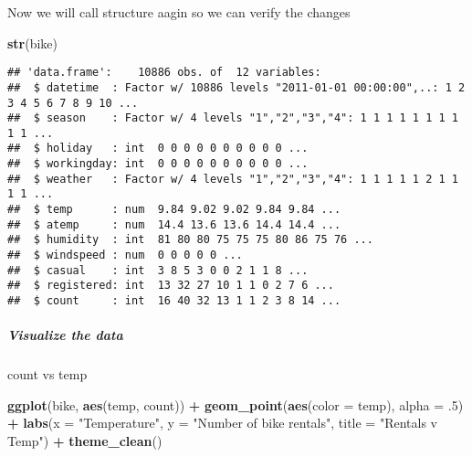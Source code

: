 \documentclass[]{article}
\newenvironment{Shaded}{\begin{snugshade}}{\end{snugshade}}
\newcommand{\KeywordTok}[1]{\textcolor[rgb]{0.13,0.29,0.53}{\textbf{#1}}}
\newcommand{\DataTypeTok}[1]{\textcolor[rgb]{0.13,0.29,0.53}{#1}}
\newcommand{\DecValTok}[1]{\textcolor[rgb]{0.00,0.00,0.81}{#1}}
\newcommand{\StringTok}[1]{\textcolor[rgb]{0.31,0.60,0.02}{#1}}
\newcommand{\OperatorTok}[1]{\textcolor[rgb]{0.81,0.36,0.00}{\textbf{#1}}}
\newcommand{\NormalTok}[1]{#1}
\let\oldsubparagraph\subparagraph
\renewcommand{\subparagraph}[1]{\oldsubparagraph{#1}\mbox{}}
\begin{document}
\begin{Shaded}
\end{Shaded}

Now we will call structure aagin so we can verify the changes

\begin{Shaded}
\begin{Highlighting}[]
\KeywordTok{str}\NormalTok{(bike)}
\end{Highlighting}
\end{Shaded}

\begin{verbatim}
## 'data.frame':    10886 obs. of  12 variables:
##  $ datetime  : Factor w/ 10886 levels "2011-01-01 00:00:00",..: 1 2 3 4 5 6 7 8 9 10 ...
##  $ season    : Factor w/ 4 levels "1","2","3","4": 1 1 1 1 1 1 1 1 1 1 ...
##  $ holiday   : int  0 0 0 0 0 0 0 0 0 0 ...
##  $ workingday: int  0 0 0 0 0 0 0 0 0 0 ...
##  $ weather   : Factor w/ 4 levels "1","2","3","4": 1 1 1 1 1 2 1 1 1 1 ...
##  $ temp      : num  9.84 9.02 9.02 9.84 9.84 ...
##  $ atemp     : num  14.4 13.6 13.6 14.4 14.4 ...
##  $ humidity  : int  81 80 80 75 75 75 80 86 75 76 ...
##  $ windspeed : num  0 0 0 0 0 ...
##  $ casual    : int  3 8 5 3 0 0 2 1 1 8 ...
##  $ registered: int  13 32 27 10 1 1 0 2 7 6 ...
##  $ count     : int  16 40 32 13 1 1 2 3 8 14 ...
\end{verbatim}

\subparagraph{Visualize the data}\label{visualize-the-data}

count vs temp

\begin{Shaded}
\begin{Highlighting}[]
\KeywordTok{ggplot}\NormalTok{(bike, }\KeywordTok{aes}\NormalTok{(temp, count)) }\OperatorTok{+}
\StringTok{    }\KeywordTok{geom_point}\NormalTok{(}\KeywordTok{aes}\NormalTok{(}\DataTypeTok{color =}\NormalTok{ temp), }\DataTypeTok{alpha =}\NormalTok{ .}\DecValTok{5}\NormalTok{) }\OperatorTok{+}
\StringTok{    }\KeywordTok{labs}\NormalTok{(}\DataTypeTok{x =} \StringTok{"Temperature"}\NormalTok{, }\DataTypeTok{y =} \StringTok{"Number of bike rentals"}\NormalTok{, }\DataTypeTok{title =} \StringTok{"Rentals v Temp"}\NormalTok{) }\OperatorTok{+}
\StringTok{    }\KeywordTok{theme_clean}\NormalTok{()}
\end{Highlighting}
\end{Shaded}
\end{document}
